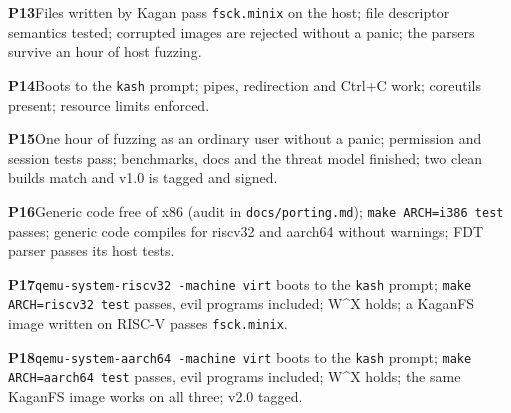 \documentclass[11pt,a4paper]{article}
\begin{document}
\begin{checklist}
  \item \textbf{P13}\enspace Files written by Kagan pass \texttt{fsck.minix} on the host; file descriptor semantics tested; corrupted images are rejected without a panic; the parsers survive an hour of host fuzzing.
  \item \textbf{P14}\enspace Boots to the \texttt{kash} prompt; pipes, redirection and Ctrl+C work; coreutils present; resource limits enforced.
  \item \textbf{P15}\enspace One hour of fuzzing as an ordinary user without a panic; permission and session tests pass; benchmarks, docs and the threat model finished; two clean builds match and v1.0 is tagged and signed.
  \item \textbf{P16}\enspace Generic code free of x86 (audit in \texttt{docs/porting.md}); \texttt{make ARCH=i386 test} passes; generic code compiles for riscv32 and aarch64 without warnings; FDT parser passes its host tests.
  \item \textbf{P17}\enspace \texttt{qemu-system-riscv32 -machine virt} boots to the \texttt{kash} prompt; \texttt{make ARCH=riscv32 test} passes, evil programs included; W\textasciicircum X holds; a KaganFS image written on RISC-V passes \texttt{fsck.minix}.
  \item \textbf{P18}\enspace \texttt{qemu-system-aarch64 -machine virt} boots to the \texttt{kash} prompt; \texttt{make ARCH=aarch64 test} passes, evil programs included; W\textasciicircum X holds; the same KaganFS image works on all three; v2.0 tagged.
\end{checklist}

\booklegend
\portlegend
\end{document}
